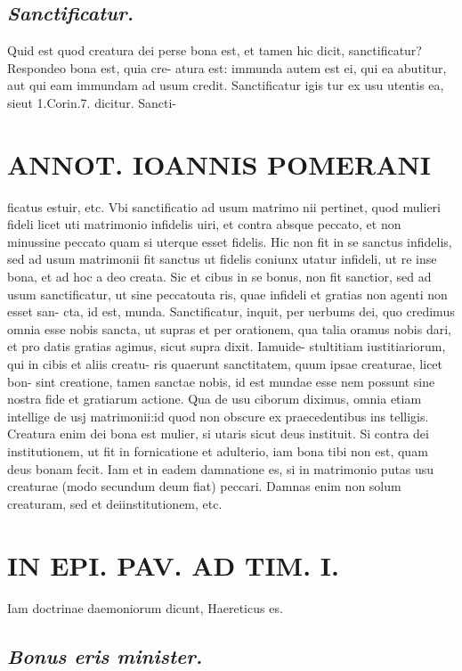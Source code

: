 \documentclass{article}
\begin{document}
\begin{pages}
\subsection*{\textit{Sanctificatur. }}\pstart Quid est quod creatura dei perse bona est, et tamen hic dicit, sanctificatur? Respondeo bona est, quia cre- atura est: immunda autem est ei, qui ea abutitur, aut qui eam immundam ad usum credit. Sanctificatur igis tur ex usu utentis ea, sieut 1.Corin.7. dicitur. Sancti-  \pend
\section*{ANNOT. IOANNIS POMERANI }\pstart ficatus estuir, etc. Vbi sanctificatio ad usum matrimo nii pertinet, quod mulieri fideli licet uti matrimonio infidelis uiri, et contra absque peccato, et non minussine peccato quam si uterque esset fidelis. Hic non fit in se sanctus infidelis, sed ad usum matrimonii fit sanctus ut fidelis coniunx utatur infideli, ut re inse bona, et ad hoc a deo creata. Sic et cibus in se bonus, non fit sanctior, sed ad usum sanctificatur, ut sine peccatouta ris, quae infideli et gratias non agenti non esset san- cta, id est, munda. Sanctificatur, inquit, per uerbums dei, quo credimus omnia esse nobis sancta, ut supras et per orationem, qua talia oramus nobis dari, et pro datis gratias agimus, sicut supra dixit. Iamuide- stultitiam iustitiariorum, qui in cibis et aliis creatu- ris quaerunt sanctitatem, quum ipsae creaturae, licet bon- sint creatione, tamen sanctae nobis, id est mundae esse nem possunt sine nostra fide et gratiarum actione. Qua de usu ciborum diximus, omnia etiam intellige de usj matrimonii:id quod non obscure ex praecedentibus ins telligis. Creatura enim dei bona est mulier, si utaris sicut deus instituit. Si contra dei institutionem, ut fit in fornicatione et adulterio, iam bona tibi non est, quam deus bonam fecit. Iam et in eadem damnatione es, si in matrimonio putas usu creaturae (modo secundum deum fiat) peccari. Damnas enim non solum creaturam, sed et deiinstitutionem, etc.  \pend
\section*{IN EPI. PAV. AD TIM. I. }
\marginpar{[ p.91 ]}\pstart Iam doctrinae daemoniorum dicunt, Haereticus es.  \pend
{}
{}
\subsection*{\textit{Bonus eris minister. }}
{}

\end{pages}
\end{document}
